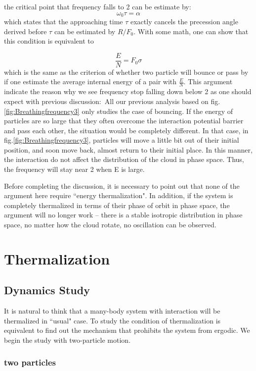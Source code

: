\documentclass[aps,pre,twocolumn,groupedaddress]{revtex4-1}
\begin{document}
the critical point that frequency falls to 2 can be estimate by:
\begin{equation}
\omega_0 \tau=\alpha
\end{equation}
which states that the approaching time $\tau$ exactly cancels the precession angle derived before
$\tau$ can be estimated by $R/F_0$. With some math, one can show that this condition is equivalent to 

\begin{equation}
\frac{E}{N}=F_0\sigma
\end{equation}
which is the same as the criterion of whether two particle will bounce or pass by if one estimate the average internal energy of a pair with $\frac{E}{N}$. This argument indicate the reason why we see frequency stop falling down below 2 as one should expect with previous discussion:\
All our previous analysis based on fig.\ref{fig:Breathingfrequency3} only studies the case of bouncing. If the energy of particles are so large that they often overcome the interaction potential barrier and pass each other, the situation would be completely different. In that case, in fig.\ref{fig:Breathingfrequency3}, particles will move a little bit out of their initial position, and soon move back, almost return to their initial place. In this manner, the interaction do not affect the distribution of the cloud in phase space. Thus, the frequency will stay near 2 when E is large.

Before completing the discussion, it is necessary to point out that none of the argument here require ``energy thermalization". In addition, if the system is completely thermalized in terms of their phase of orbit in phase space, the argument will no longer work -- there is a stable isotropic distribution in phase space, no matter how the cloud rotate, no oscillation can be observed.


\section{Thermalization}\label{section:Thermalization}
\subsection{Dynamics Study}
It is natural to think that a many-body system with interaction will be thermalized in ``usual" case. To study the condition of thermalization is equivalent to find out the mechanism that prohibits the system from ergodic. We begin the study with two-particle motion. 
\subsubsection{two particles}
\end{document}
